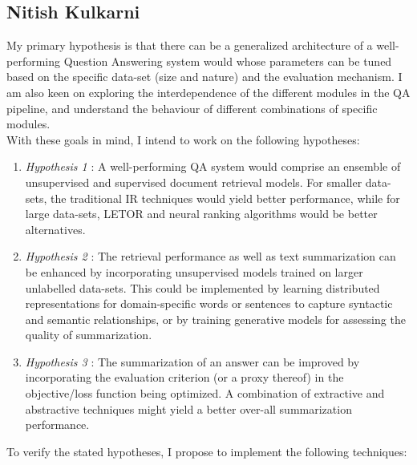 \documentclass{article}
\begin{document}
\pagebreak

\subsection{Nitish Kulkarni}

My primary hypothesis is that there can be a generalized architecture of a well-performing Question Answering system would whose parameters can be tuned based on the specific data-set (size and nature) and the evaluation mechanism. I am also keen on exploring the interdependence of the different modules in the QA pipeline, and understand the behaviour of different combinations of specific modules. \\

With these goals in mind, I intend to work on the following hypotheses:

\begin{enumerate}

    \item[] \textit{Hypothesis 1} : A well-performing QA system would comprise an ensemble of unsupervised and supervised document retrieval models. For smaller data-sets, the traditional IR techniques would yield better performance, while for large data-sets, LETOR and neural ranking algorithms would be better alternatives.
    
    \item[] \textit{Hypothesis 2} : The retrieval performance as well as text summarization can be enhanced by incorporating unsupervised models trained on larger unlabelled data-sets. This could be implemented by learning distributed representations for domain-specific words or sentences to capture syntactic and semantic relationships, or by training generative models for assessing the quality of summarization.
    
    \item[] \textit{Hypothesis 3} : The summarization of an answer can be improved by incorporating the evaluation criterion (or a proxy thereof) in the objective/loss function being optimized. A combination of extractive and abstractive techniques might yield a better over-all summarization performance.
    
\end{enumerate}

To verify the stated hypotheses, I propose to implement the following techniques:
\end{document}
